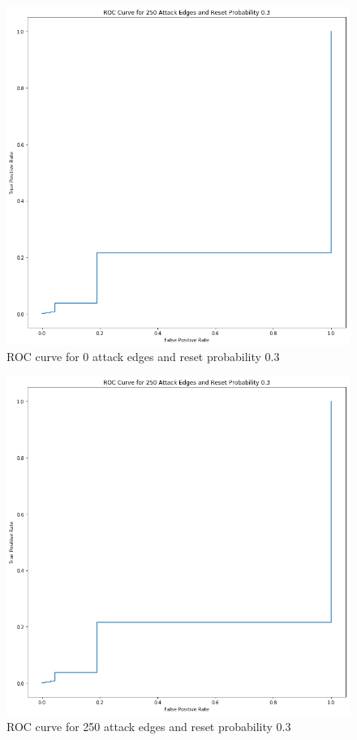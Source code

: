 \documentclass[sigconf]{acmart}
\theoremstyle{definition}
\begin{document}
\begin{figure}
\includegraphics[scale=0.3]{ROCCurve1}
\caption{ROC curve for 0 attack edges and reset probability 0.3}
\label{fig:ROCCurve1}
\end{figure}

\begin{figure}
\includegraphics[scale=0.3]{ROCCurve2}
\caption{ROC curve for 250 attack edges and reset probability 0.3}
\label{fig:ROCCurve2}
\end{figure}
\end{document}
